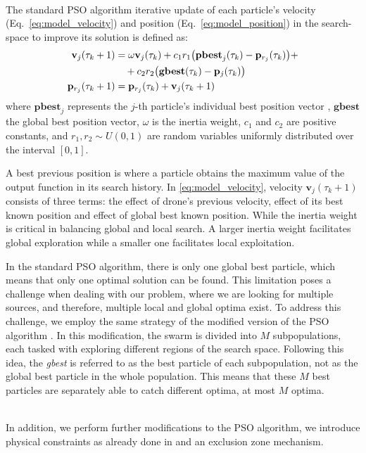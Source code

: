 \noindent
\\
The standard PSO algorithm iterative update of each particle's velocity
(Eq.~\ref{eq:model_velocity}) and position (Eq.~\ref{eq:model_position})
in the search-space to improve its solution is defined as:
\begin{align}
    \mathbf{v}_{j}(\tau_k+1) &= \omega \mathbf{v}_{j}(\tau_k) 
    + c_1 r_1 \big(\mathbf{pbest}_{j}(\tau_k) - \mathbf{p}_{r_j}(\tau_k)\big) + \notag \\
    &\quad + c_2 r_2 \big(\mathbf{gbest}(\tau_k) - \mathbf{p}_{j}(\tau_k)\big) \label{eq:model_velocity} \\
    \mathbf{p}_{r_j}(\tau_k + 1) &= \mathbf{p}_{r_j}(\tau_k) + \mathbf{v}_{j}(\tau_k+1) \label{eq:model_position}
\end{align}
where $\mathbf{pbest}_j$ represents the $j$-th particle's individual best position vector  
, $\mathbf{gbest}$ the global best position vector, $\omega$ is the inertia weight,
$c_1$ and $c_2$ are positive constants, and $r_1, r_2 \sim \textit{U}(0,1)$ are random variables 
uniformly distributed over the interval $[0, 1]$.

A best previous position is where a particle obtains the 
maximum value of the output function in its search
history.
In \ref{eq:model_velocity}, velocity $\mathbf{v}_{j}(\tau_k+1)$ 
consists of three terms: the effect of drone’s previous velocity, 
effect of its best known position and effect of global best
known position.
While the inertia weight is critical in balancing global and local search. 
A larger inertia weight facilitates global exploration while a smaller one
facilitates local exploitation.

In the standard PSO algorithm, there is only one global best particle, 
which means that only one optimal solution can be found. This limitation 
poses a challenge when dealing with our problem, where we are looking for multiple sources, 
and therefore, multiple local and global optima exist. To address this challenge, 
we employ the same strategy of the modified version of the PSO algorithm \cite{PSO_IMPORTANT}. 
In this modification, the swarm is divided into $M$ subpopulations, each tasked with exploring 
different regions of the search space. Following this idea, the \textit{gbest} is referred to as 
the best particle of each subpopulation, not as the global best particle in the whole population. 
This means that these $M$ best particles are separately able to catch different optima, 
at most $M$ optima.

\noindent
\\
In addition, we perform further modifications to the PSO algorithm,
we introduce physical constraints as already done in \cite{3} and 
an exclusion zone mechanism.

